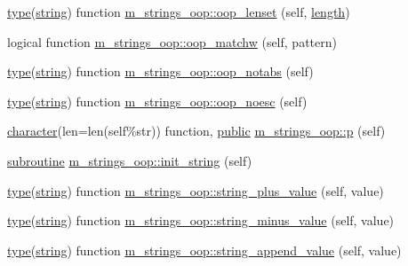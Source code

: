 \begin{DoxyCompactItemize}
\item 
\hyperlink{stop__watch_83_8txt_a70f0ead91c32e25323c03265aa302c1c}{type}(\hyperlink{what__overview_81_8txt_a74cb7e955273b9f9157b4f0c18a38849}{string}) function \hyperlink{namespacem__strings__oop_ac8ca18186659b8759b08e5167a3effb5}{m\+\_\+strings\+\_\+oop\+::oop\+\_\+lenset} (self, \hyperlink{M__stopwatch_83_8txt_a04ed5ef37abacfa36a856b5f30376485}{length})
\item 
logical function \hyperlink{namespacem__strings__oop_ab88f5f814c08f1c93c95fcd0ba2a6779}{m\+\_\+strings\+\_\+oop\+::oop\+\_\+matchw} (self, pattern)
\item 
\hyperlink{stop__watch_83_8txt_a70f0ead91c32e25323c03265aa302c1c}{type}(\hyperlink{what__overview_81_8txt_a74cb7e955273b9f9157b4f0c18a38849}{string}) function \hyperlink{namespacem__strings__oop_a5959b2f967a6466c198b39a089ef8a68}{m\+\_\+strings\+\_\+oop\+::oop\+\_\+notabs} (self)
\item 
\hyperlink{stop__watch_83_8txt_a70f0ead91c32e25323c03265aa302c1c}{type}(\hyperlink{what__overview_81_8txt_a74cb7e955273b9f9157b4f0c18a38849}{string}) function \hyperlink{namespacem__strings__oop_ae1ed148f1ae0694ac093d3e11f9b702b}{m\+\_\+strings\+\_\+oop\+::oop\+\_\+noesc} (self)
\item 
\hyperlink{option__stopwatch_83_8txt_abd4b21fbbd175834027b5224bfe97e66}{character}(len=len(self\%str)) function, \hyperlink{M__stopwatch_83_8txt_a2f74811300c361e53b430611a7d1769f}{public} \hyperlink{namespacem__strings__oop_a456e651940e317c7bc885d95458c7fcb}{m\+\_\+strings\+\_\+oop\+::p} (self)
\item 
\hyperlink{M__stopwatch_83_8txt_acfbcff50169d691ff02d4a123ed70482}{subroutine} \hyperlink{namespacem__strings__oop_a1510c1de10cb182598ce6a399a734be0}{m\+\_\+strings\+\_\+oop\+::init\+\_\+string} (self)
\item 
\hyperlink{stop__watch_83_8txt_a70f0ead91c32e25323c03265aa302c1c}{type}(\hyperlink{what__overview_81_8txt_a74cb7e955273b9f9157b4f0c18a38849}{string}) function \hyperlink{namespacem__strings__oop_abf27744e539317dac81d6ed1fb736059}{m\+\_\+strings\+\_\+oop\+::string\+\_\+plus\+\_\+value} (self, value)
\item 
\hyperlink{stop__watch_83_8txt_a70f0ead91c32e25323c03265aa302c1c}{type}(\hyperlink{what__overview_81_8txt_a74cb7e955273b9f9157b4f0c18a38849}{string}) function \hyperlink{namespacem__strings__oop_a0ec84db43ac789bfc02f46f933a3fc9f}{m\+\_\+strings\+\_\+oop\+::string\+\_\+minus\+\_\+value} (self, value)
\item 
\hyperlink{stop__watch_83_8txt_a70f0ead91c32e25323c03265aa302c1c}{type}(\hyperlink{what__overview_81_8txt_a74cb7e955273b9f9157b4f0c18a38849}{string}) function \hyperlink{namespacem__strings__oop_a64192a93804fcb61ca59725245ee85c2}{m\+\_\+strings\+\_\+oop\+::string\+\_\+append\+\_\+value} (self, value)

\end{DoxyCompactItemize}

